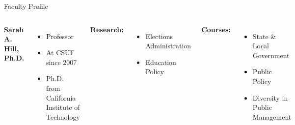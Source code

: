 \documentclass[10pt]{beamer}
\newlength{\imageheight}
\begin{document}
        \begin{frame}{Faculty Profile}
        \begin{columns}[T]
        \textbf{Sarah A. Hill, Ph.D.}
        \begin{itemize}
        \item Professor
        \item At CSUF since 2007
        \item Ph.D. from California Institute of Technology
        \end{itemize}
        
        \textbf{Research:} 
        \begin{itemize}
            \item Elections Administration
            \item Education Policy
        \end{itemize}

        \textbf{Courses:} 
        \begin{itemize}
        \item State \& Local Government
        \item Public Policy
        \item Diversity in Public Management
        \end{itemize}
        \vspace*{0.5cm}
        \includegraphics[height=\imageheight]{images/hill.jpg}
        \end{columns}
        \end{frame}
        
\end{document}
